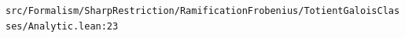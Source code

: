 \nolinkurl{src/Formalism/SharpRestriction/RamificationFrobenius/TotientGaloisClasses/Analytic.lean:23}%
